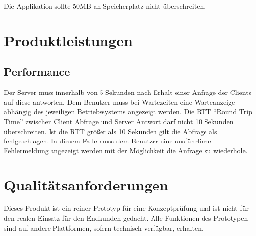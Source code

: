 \documentclass[a4paper,12pt,oneside]{scrartcl}
\begin{document}


Die Applikation sollte 50MB an Speicherplatz nicht überschreiten.




\section{Produktleistungen}
\hypertarget{s07}{\subsection{Performance}}
Der Server muss innerhalb von 5 Sekunden nach Erhalt einer Anfrage der Clients auf diese antworten.
Dem Benutzer muss bei Wartezeiten eine Warteanzeige abhängig des jeweiligen Betriebssystems angezeigt werden. 
Die RTT "`Round Trip Time"' zwischen Client Abfrage und Server Antwort darf nicht 10 Sekunden überschreiten.
Ist die RTT größer als 10 Sekunden gilt die Abfrage als fehlgeschlagen.
In diesem Falle muss dem Benutzer eine ausführliche Fehlermeldung angezeigt werden mit der Möglichkeit die Anfrage zu wiederhole. 




\section{Qualitätsanforderungen}
Dieses Produkt ist ein reiner Prototyp für eine Konzeptprüfung und ist nicht für den realen Einsatz für den Endkunden gedacht.
Alle Funktionen des Prototypen sind auf andere Plattformen, sofern technisch verfügbar, erhalten.
\end{document}
